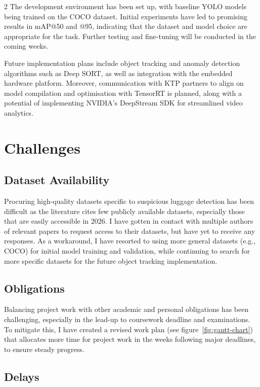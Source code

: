 \documentclass{article}
\begin{document}
\begin{multicols*}{2}
	The development environment has been set up, with baseline YOLO models being
	trained on the COCO dataset. Initial experiments have led to promising results
	in mAP@50 and @95, indicating that the dataset and model choice are appropriate
	for the task. Further testing and fine-tuning will be conducted in the coming
	weeks.

	Future implementation plans include object tracking and anomaly detection
	algorithms such as Deep SORT, as well as integration with the embedded hardware
	platform. Moreover, communication with KTP partners to align on model
	compilation and optimisation with TensorRT is planned, along with a potential
	of implementing NVIDIA's DeepStream SDK for streamlined video analytics.

	\section*{Challenges}

	\subsection*{Dataset Availability}

	Procuring high-quality datasets specific to suspicious luggage detection has
	been difficult as the literature cites few publicly available datasets,
	especially those that are easily accessible in 2026. I have gotten in contact
	with multiple authors of relevant papers to request access to their datasets,
	but have yet to receive any responses. As a workaround, I have resorted to
	using more general datasets (e.g., COCO) for initial model training and
	validation, while continuing to search for more specific datasets for the
	future object tracking implementation.

	\subsection*{Obligations}

	Balancing project work with other academic and personal obligations has been
	challenging, especially in the lead-up to coursework deadline and examinations.
	To mitigate this, I have created a revised work plan (see
	figure~\ref{fig:gantt-chart}) that allocates more time for project work in the
	weeks following major deadlines, to ensure steady progress.

	\subsection*{Delays}


\end{multicols*}
\end{document}
